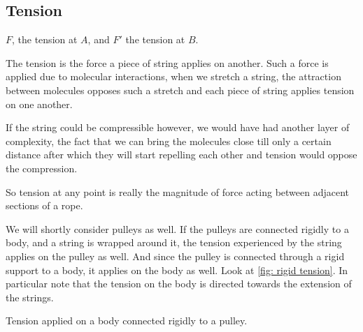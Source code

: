\subsection{Tension}

\begin{marginfigure}
    \caption{\(F\), the tension at \(A\), and \(F'\) the tension at \(B\).}
\end{marginfigure}

The tension is the force a piece of string applies on another. Such a force 
is applied due to molecular interactions, when we stretch a string, the attraction 
between molecules opposes such a stretch and each piece of string applies tension on one another.

If the string could be compressible however, we would have had another layer of complexity,
the fact that we can bring the molecules close till only a certain distance after which 
they will start repelling each other and tension would oppose the compression.

So tension at any point is really the magnitude of force acting between adjacent sections of a rope.

We will shortly consider pulleys as well. If the pulleys are connected rigidly to 
a body, and a string is wrapped around it, the tension experienced by the string applies on the 
pulley as well. And since the pulley is connected through a rigid support to a body, 
it applies on the body as well. Look at \cref{fig: rigid tension}. In particular note that 
the tension on the body is directed towards the extension of the strings.

\begin{marginfigure}
    \caption{Tension applied on a body connected rigidly to a pulley.}
    \label{fig: rigid tension}
\end{marginfigure}

